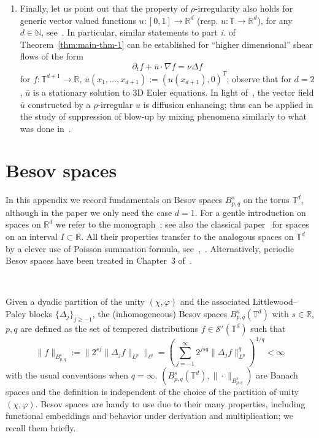 \documentclass[11pt,oneside,reqno]{amsart}
\newcommand{\assign}{:=}
\newcommand{\tmtextit}[1]{{{\itshape{#1}}}}
\newenvironment{enumeratenumeric}{\begin{enumerate}[1.] }{\end{enumerate}}
\numberwithin{equation}{section}
\begin{document}
\begin{enumeratenumeric}
  \item Finally, let us point out that the property of $\rho$-irregularity
  also holds for generic vector valued functions $u : [0, 1] \rightarrow
  \mathbb{R}^d$ (resp. $u : \mathbb{T} \rightarrow \mathbb{R}^d$), for any $d
  \in \mathbb{N}$, see~{\cite{galeati2020prevalence}}. In particular, similar
  statements to part \tmtextit{i.} of Theorem~\ref{thm:main-thm-1} can be
  established for ``higher dimensional'' shear flows of the form
  \[ \partial_t f + \bar{u} \cdot \nabla f = \nu \Delta f \]
  for $f : \mathbb{T}^{d + 1} \rightarrow \mathbb{R}$, $\bar{u} (x_1, \ldots,
  x_{d + 1}) \assign (u (x_{d + 1}), 0)^T$; observe that for $d = 2$,
  $\bar{u}$ is a stationary solution to $3$D Euler equations. In light
  of~{\cite{constantin2008}}, the vector field $\bar{u}$ constructed by a
  $\rho$-irregular $u$ is diffusion enhancing; thus can be applied in the
  study of suppression of blow-up by mixing phenomena similarly to what was
  done in~{\cite{kiselev2016,bedrossian2017suppression,iyer2021}}.
\end{enumeratenumeric}
\appendix\section{Besov spaces}\label{app:besov}

In this appendix we record fundamentals on Besov spaces $B^s_{p, q}$ on the
torus $\mathbb{T}^d$, although in the paper we only need the case $d = 1$. For
a gentle introduction on spaces on $\mathbb{R}^d$ we refer to the
monograph~{\cite{bahouri}}; see also the classical paper~{\cite{simon}} for
spaces on an interval $I \subset \mathbb{R}$. All their properties transfer to
the analogous spaces on $\mathbb{T}^d$ by a clever use of Poisson summation
formula, see~{\cite{gubinelli2015lectures}},~{\cite{mourrat}}. Alternatively,
periodic Besov spaces have been treated in Chapter~3
of~{\cite{schmeisser1987}}.

\

Given a dyadic partition of the unity $(\chi, \varphi)$ and the associated
Littlewood--Paley blocks $\{ \Delta_j \}_{j \geqslant - 1}$, the
(inhomogeneous) Besov spaces $B^s_{p, q} (\mathbb{T}^d)$ with $s \in
\mathbb{R}$, $p, q$ are defined as the set of tempered distributions $f \in
\mathcal{S}' (\mathbb{T}^d)$ such that
\[ \| f \|_{B^s_{p, q}} \assign \| 2^{s j}  \| \Delta_j f \|_{L^p} \|_{\ell^q}
   = \left( \sum_{j = - 1}^{\infty} 2^{j s q}  \| \Delta_j f \|_{L^p}^q
   \right)^{1 / q} < \infty \]
with the usual conventions when $q = \infty$. $(B^s_{p, q} (\mathbb{T}^d), \|
\cdot \|_{B^s_{p, q}})$ are Banach spaces and the definition is independent of
the choice of the partition of unity $(\chi, \varphi)$. Besov spaces are handy
to use due to their many properties, including functional embeddings and
behavior under derivation and multiplication; we recall them briefly.
\end{document}
